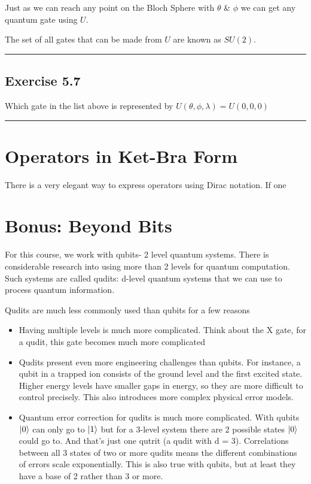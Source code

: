 \documentclass{book}
\begin{document}
Just as we can reach any point on the Bloch Sphere with $\theta$ \& $\phi$ we can get any quantum gate using $U$. 

The set of all gates that can be made from $U$ are known as $SU(2)$. \newline
\hrule
\subsection{Exercise 5.7}
Which gate in the list above is represented by  $U(\theta, \phi, \lambda) = U(0,0,0)$ \newline 
\hrule

\section{ Operators in Ket-Bra Form}

There is a very elegant way to express operators using Dirac notation. If one 

\section{ Bonus: Beyond Bits }

For this course, we work with qubits- 2 level quantum systems. There is considerable research into using more than 2 levels for quantum computation. Such systems are called qudits: d-level quantum systems that we can use to process quantum information. 

Qudits are much less commonly used than qubits for a few reasons
\begin{itemize}
\item Having multiple levels is much more complicated. Think about the X gate, for a qudit, this gate becomes much more complicated

\item Qudits present even more engineering challenges than qubits. For instance, a qubit in a trapped ion consists of the ground level and the first excited state. Higher energy levels have smaller gaps in energy, so they are more difficult to control precisely. This also introduces more complex physical error models. 

\item Quantum error correction for qudits is much more complicated. With qubits $\ket{0}$ can only go to $\ket{1}$ but for a 3-level system there are 2 possible states $\ket{0}$ could go to. And that's just one qutrit (a qudit with d = 3). Correlations between all 3 states of two or more qudits means the different combinations of errors scale exponentially. This is also true with qubits, but at least they have a base of 2 rather than 3 or more.
\end{itemize}
\end{document}
